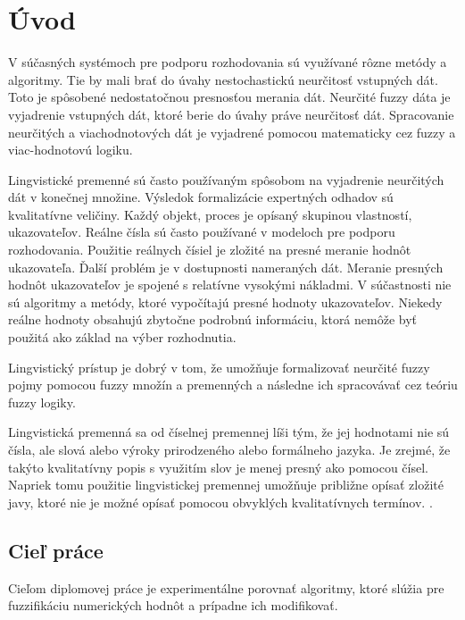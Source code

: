 \chapter*{Úvod}
V súčasných systémoch pre podporu rozhodovania sú využívané rôzne metódy a algoritmy. Tie by mali brať do úvahy nestochastickú neurčitosť vstupných dát. Toto je spôsobené nedostatočnou presnosťou merania dát.  Neurčité fuzzy dáta je vyjadrenie vstupných dát, ktoré berie do úvahy práve neurčitosť dát. Spracovanie neurčitých a viachodnotových dát je vyjadrené pomocou matematicky cez fuzzy a viac-hodnotovú logiku.  

Lingvistické premenné sú často používaným spôsobom na vyjadrenie neurčitých dát v konečnej množine. Výsledok formalizácie expertných odhadov sú kvalitatívne veličiny. Každý objekt, proces je opísaný skupinou vlastností, ukazovateľov. Reálne čísla sú často používané v modeloch pre podporu rozhodovania. Použitie reálnych čísiel je zložité na presné meranie hodnôt ukazovateľa. Ďalší problém je v dostupnosti nameraných dát. Meranie presných hodnôt ukazovateľov je spojené s relatívne vysokými nákladmi. V súčastnosti nie sú algoritmy a metódy, ktoré vypočítajú presné hodnoty ukazovateľov. Niekedy reálne hodnoty obsahujú zbytočne podrobnú informáciu, ktorá nemôže byť použitá ako základ na výber rozhodnutia. 

Lingvistický prístup je dobrý v tom, že umožňuje formalizovať neurčité fuzzy pojmy pomocou fuzzy množín a premenných a následne ich spracovávať cez teóriu fuzzy logiky. 

Lingvistická premenná sa od číselnej premennej líši tým, že jej hodnotami nie sú čísla, ale slová alebo výroky prirodzeného alebo formálneho jazyka. Je zrejmé, že takýto kvalitatívny popis s využitím slov je menej presný ako pomocou čísel. Napriek tomu použitie lingvistickej premennej umožňuje približne opísať zložité javy, ktoré nie je možné opísať pomocou obvyklých kvalitatívnych termínov. \cite{levashenkoProj}.


\section*{Cieľ práce}
Cieľom diplomovej práce je experimentálne porovnať algoritmy, ktoré slúžia pre fuzzifikáciu numerických hodnôt a prípadne ich modifikovať.

